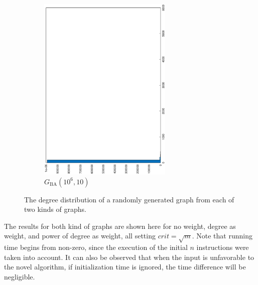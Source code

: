 \documentclass[12pt]{report}
\begin{document}
\begin{figure}
\begin{subfigure}{0.45\textwidth}
	\includegraphics[width=0.7\textwidth,angle=-90]{graph/ba_degree.eps}
	\caption{$ G_\mathrm{BA}(10^6, 10) $}
\end{subfigure}
\caption{The degree distribution of a randomly generated graph from each of two kinds of graphs.}
\end{figure}

The results for both kind of graphs are shown here for no weight, degree as weight, and power of degree as weight, all setting $ \mathit{crit} = \sqrt{m} $.
Note that running time begins from non-zero, since the execution of the initial $ n $ instructions were taken into account.
It can also be observed that when the input is unfavorable to the novel algorithm,
if initialization time is ignored, the time difference will be negligible.
\end{document}
